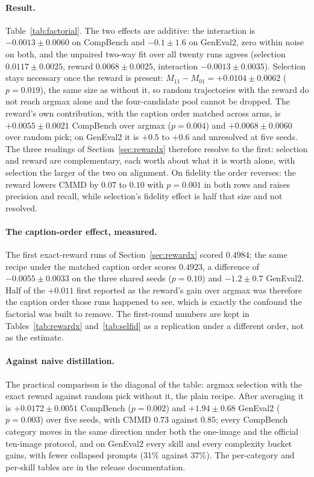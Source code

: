 \documentclass[11pt,a4paper]{article}
\begin{document}
\paragraph{Result.}
Table~\ref{tab:factorial}. The two effects are additive: the interaction is $-0.0013\pm0.0060$ on CompBench and $-0.1\pm1.6$ on GenEval2, zero within noise on both, and the unpaired two-way fit over all twenty runs agrees (selection $0.0117\pm0.0025$, reward $0.0068\pm0.0025$, interaction $-0.0013\pm0.0035$). Selection stays necessary once the reward is present: $M_{11}-M_{01}=+0.0104\pm0.0062$ ($p=0.019$), the same size as without it, so random trajectories with the reward do not reach argmax alone and the four-candidate pool cannot be dropped. The reward's own contribution, with the caption order matched across arms, is $+0.0055\pm0.0021$ CompBench over argmax ($p=0.004$) and $+0.0068\pm0.0060$ over random pick; on GenEval2 it is $+0.5$ to $+0.6$ and unresolved at five seeds. The three readings of Section~\ref{sec:rewardx} therefore resolve to the first: selection and reward are complementary, each worth about what it is worth alone, with selection the larger of the two on alignment. On fidelity the order reverses: the reward lowers CMMD by $0.07$ to $0.10$ with $p=0.001$ in both rows and raises precision and recall, while selection's fidelity effect is half that size and not resolved.

\paragraph{The caption-order effect, measured.}
The first exact-reward runs of Section~\ref{sec:rewardx} scored $0.4984$; the same recipe under the matched caption order scores $0.4923$, a difference of $-0.0055\pm0.0033$ on the three shared seeds ($p=0.10$) and $-1.2\pm0.7$ GenEval2. Half of the $+0.011$ first reported as the reward's gain over argmax was therefore the caption order those runs happened to see, which is exactly the confound the factorial was built to remove. The first-round numbers are kept in Tables~\ref{tab:rewardx} and~\ref{tab:selfid} as a replication under a different order, not as the estimate.

\paragraph{Against naive distillation.}
The practical comparison is the diagonal of the table: argmax selection with the exact reward against random pick without it, the plain recipe. After averaging it is $+0.0172\pm0.0051$ CompBench ($p=0.002$) and $+1.94\pm0.68$ GenEval2 ($p=0.003$) over five seeds, with CMMD $0.73$ against $0.85$; every CompBench category moves in the same direction under both the one-image and the official ten-image protocol, and on GenEval2 every skill and every complexity bucket gains, with fewer collapsed prompts (31\% against 37\%). The per-category and per-skill tables are in the release documentation.
\end{document}
